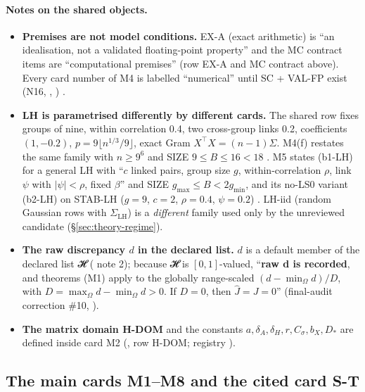 \paragraph{Notes on the shared objects.}
\begin{itemize}
\item \textbf{Premises are not model conditions.} EX-A (exact arithmetic) is ``an idealisation, not a validated floating-point property'' and the MC contract items are ``computational premises'' (row EX-A and MC contract above). Every card number of M4 is labelled ``numerical'' until SC + VAL-FP exist (N16, , ) .
\item \textbf{LH is parametrised differently by different cards.} The shared row fixes groups of nine, within correlation 0.4, two cross-group links 0.2, coefficients $(1,-0.2)$, $p=9\lfloor n^{1/3}/9\rfloor$, exact Gram $X^{\top}X=(n-1)\Sigma$. M4(f) restates the same family with $n\ge 9^6$ and SIZE $9\le B\le 16<18$ . M5 states (b1-LH) for a general LH with ``$c$ linked pairs, group size $g$, within-correlation $\rho$, link $\psi$ with $|\psi|<\rho$, fixed $\beta$'' and SIZE $g_{\max}\le B<2g_{\min}$, and its no-LS0 variant (b2-LH) on STAB-LH ($g=9$, $c=2$, $\rho=0.4$, $\psi=0.2$) . LH-iid (random Gaussian rows with $\Sigma_{\mathrm{LH}}$) is a \emph{different} family used only by the unreviewed candidate  (§\ref{sec:theory-regime}).
\item \textbf{The raw discrepancy $d$ in the declared list.} $d$ is a default member of the declared list 𝓗 ( note 2); because 𝓗 is $[0,1]$-valued, ``\textbf{raw d is recorded}, and theorems (M1) apply to the globally range-scaled $(d-\min_{\Omega} d)/D$, with $D=\max_{\Omega} d-\min_{\Omega} d>0$. If $D=0$, then $\hat{J}=J=0$''  (final-audit correction \#10, ).
\item \textbf{The matrix domain H-DOM} and the constants $a,\delta_A,\delta_H,r,C_{\sigma},b_X,D_{*}$ are defined inside card M2 (, row H-DOM; registry ).
\end{itemize}

\subsection{The main cards M1–M8 and the cited card S-T}\label{sec:theory-cards}

